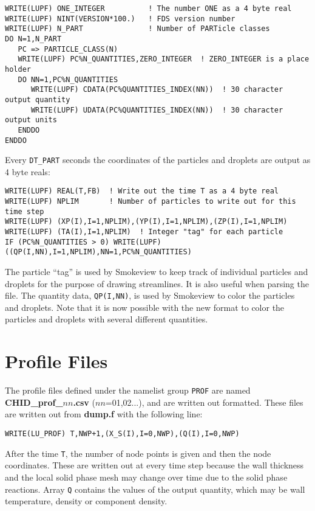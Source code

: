 \documentclass[11pt]{book}
\newcommand{\ct}{\tt\small}
\begin{document}
\footnotesize
\begin{verbatim}
WRITE(LUPF) ONE_INTEGER          ! The number ONE as a 4 byte real
WRITE(LUPF) NINT(VERSION*100.)   ! FDS version number
WRITE(LUPF) N_PART               ! Number of PARTicle classes
DO N=1,N_PART
   PC => PARTICLE_CLASS(N)
   WRITE(LUPF) PC%N_QUANTITIES,ZERO_INTEGER  ! ZERO_INTEGER is a place holder
   DO NN=1,PC%N_QUANTITIES
      WRITE(LUPF) CDATA(PC%QUANTITIES_INDEX(NN))  ! 30 character output quantity
      WRITE(LUPF) UDATA(PC%QUANTITIES_INDEX(NN))  ! 30 character output units
   ENDDO
ENDDO
\end{verbatim}
\normalsize
Every {\ct DT\_PART} seconds the coordinates of the particles and droplets are output as 4 byte reals:

\footnotesize
\begin{verbatim}
WRITE(LUPF) REAL(T,FB)  ! Write out the time T as a 4 byte real
WRITE(LUPF) NPLIM       ! Number of particles to write out for this time step
WRITE(LUPF) (XP(I),I=1,NPLIM),(YP(I),I=1,NPLIM),(ZP(I),I=1,NPLIM)
WRITE(LUPF) (TA(I),I=1,NPLIM)  ! Integer "tag" for each particle
IF (PC%N_QUANTITIES > 0) WRITE(LUPF) ((QP(I,NN),I=1,NPLIM),NN=1,PC%N_QUANTITIES)
\end{verbatim}
\normalsize
The particle ``tag'' is used by Smokeview to keep track of individual particles and droplets for the purpose of drawing
streamlines. It is also useful when parsing the file. The quantity data, {\ct QP(I,NN)}, is used by Smokeview to color
the particles and droplets. Note that it is now possible with the new format to color the particles and droplets with
several different quantities.

\section{Profile Files}%
\label{out:PROF}

The profile files defined under the namelist group {\ct PROF} are
named {\bf CHID\_prof\_$nn$.csv} ($nn$=01,02...),
and are written out formatted. These files are written out from {\bf
dump.f} with the following line:

\footnotesize
\begin{verbatim}
WRITE(LU_PROF) T,NWP+1,(X_S(I),I=0,NWP),(Q(I),I=0,NWP)
\end{verbatim}
\normalsize
After the time {\ct T}, the number of node points is given and then
the node coordinates. These are written out at every time step because
the wall thickness and the local solid phase mesh may change over time
due to the solid phase reactions. Array {\ct Q} contains the values of
the output quantity, which may be wall temperature, density or
component density.
\end{document}
